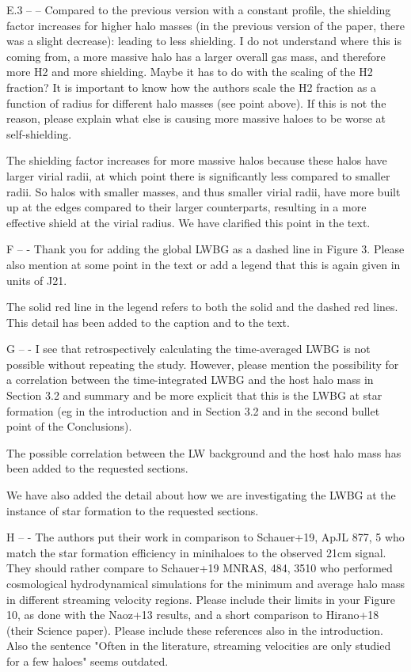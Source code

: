 \documentclass[11pt]{article}
\newenvironment{referee}[1][]{%
    \ignorespaces%
    \begin{mdframed}[style=myquotestyle,#1]%
}{%
    \end{mdframed}%
    \ignorespacesafterend%
}%
\begin{document}
\begin{referee}
    E.3 -- -- Compared to the previous version with a constant profile, the shielding factor increases for higher halo masses (in the previous version of the paper, there was a slight decrease): leading to less shielding. I do not understand where this is coming from, a more massive halo has a larger overall gas mass, and therefore more H2 and more shielding. Maybe it has to do with the scaling of the H2 fraction?  It is important to know how the authors scale the H2 fraction as a function of radius for different halo masses (see point above). If this is not the reason, please explain what else is causing more massive haloes to be worse at self-shielding.  
\end{referee}
    The shielding factor increases for more massive halos because these halos have larger virial radii, at which point there is significantly less \hh{} compared to smaller radii. So halos with smaller masses, and thus smaller virial radii, have more \hh{} built up at the edges compared to their larger counterparts, resulting in a more effective shield at the virial radius. We have clarified this point in the text.

\begin{referee}
    F -- - Thank you for adding the global LWBG as a dashed line in Figure 3. Please also mention at some point in the text or add a legend that this is again given in units of J21. 
\end{referee}
    The solid red line in the legend refers to both the solid and the dashed red lines. This detail has been added to the caption and to the text. 

\begin{referee}
    G -- - I see that retrospectively calculating the time-averaged LWBG is not possible without repeating the study. However, please mention the possibility for a correlation between the time-integrated LWBG and the host halo mass in Section 3.2 and summary and be more explicit that this is the LWBG at star formation (eg in the introduction and in Section 3.2 and in the second bullet point of the Conclusions).  
\end{referee}
    The possible correlation between the LW background and the host halo mass has been added to the requested sections.

    We have also added the detail about how we are investigating the LWBG at the instance of star formation to the requested sections.

\begin{referee}
    H -- - The authors put their work in comparison to Schauer+19, ApJL 877, 5 who match the star formation efficiency in minihaloes to the observed 21cm signal. They should rather compare to Schauer+19 MNRAS, 484, 3510 who performed cosmological hydrodynamical simulations for the minimum and average halo mass in different streaming velocity regions. Please include their limits in your Figure 10, as done with the Naoz+13 results, and a short comparison to Hirano+18 (their Science paper). Please include these references also in the introduction. Also the sentence "Often in the literature, streaming velocities are only studied for a few haloes" seems outdated.
\end{referee}
    
\end{document}
